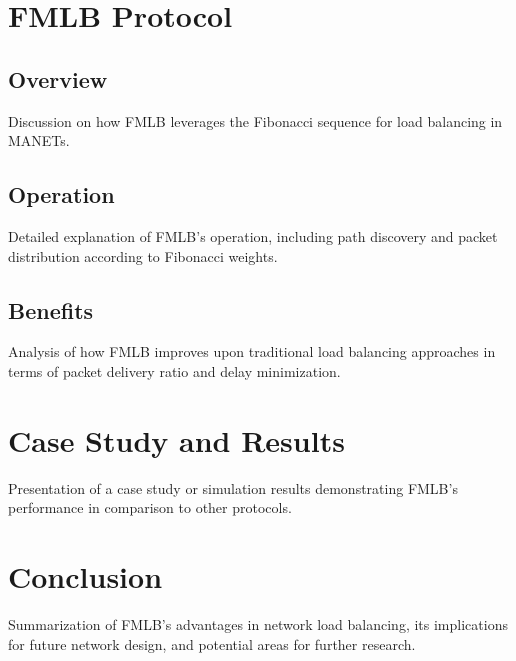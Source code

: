 \documentclass[12pt]{article}
\begin{document}
\section{FMLB Protocol}
\subsection{Overview}
Discussion on how FMLB leverages the Fibonacci sequence for load balancing in MANETs.

\subsection{Operation}
Detailed explanation of FMLB's operation, including path discovery and packet distribution according to Fibonacci weights.

\subsection{Benefits}
Analysis of how FMLB improves upon traditional load balancing approaches in terms of packet delivery ratio and delay minimization.

\section{Case Study and Results}
Presentation of a case study or simulation results demonstrating FMLB's performance in comparison to other protocols.

\section{Conclusion}
Summarization of FMLB's advantages in network load balancing, its implications for future network design, and potential areas for further research.



\end{document}
